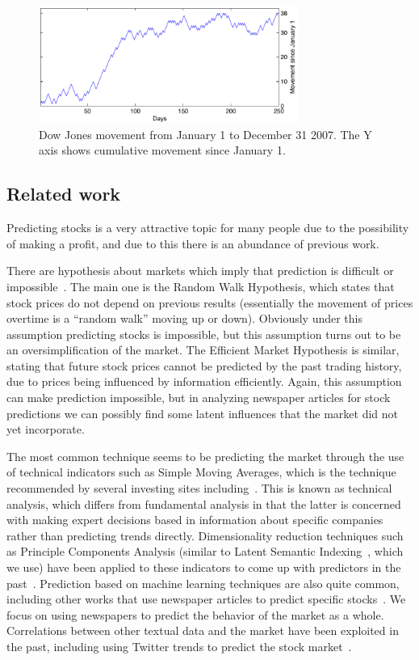 \documentclass[10pt, twocolumn]{article}
\begin{document}
\begin{figure}
\includegraphics[width=8.5cm]{experiments/dj_performance.pdf}
\caption{Dow Jones movement from January 1 to December 31 2007. The Y axis shows cumulative movement since January 1.}
\label{fig:dj-preformance}
\end{figure}

\subsection{Related work}

Predicting stocks is a very attractive topic for many people due to the possibility of making a profit, and due to this there is an abundance of previous work.

There are hypothesis about markets which imply that prediction is difficult or impossible~\cite{mlstockmarket}. The main one is the Random Walk Hypothesis, which states that stock prices do not depend on previous results (essentially the movement of prices overtime is a ``random walk'' moving up or down). Obviously under this assumption predicting stocks is impossible, but this assumption turns out to be an oversimplification of the market. The Efficient Market Hypothesis is similar, stating that future stock prices cannot be predicted by the past trading history, due to prices being influenced by information efficiently. Again, this assumption can make prediction impossible, but in analyzing newspaper articles for stock predictions we can possibly find some latent influences that the market did not yet incorporate.

The most common technique seems to be predicting the market through the use of technical indicators such as Simple Moving Averages, which is the technique recommended by several investing sites including~\cite{techindicator}. This is known as technical analysis, which differs from fundamental analysis in that the latter is concerned with making expert decisions based in information about specific companies~\cite{mlstockmarket} rather than predicting trends directly. Dimensionality reduction techniques such as Principle Components Analysis (similar to Latent Semantic Indexing~\cite{lsi}, which we use) have been applied to these indicators to come up with predictors in the past~\cite{techdim}. Prediction based on machine learning techniques are also quite common, including other works that use newspaper articles to predict specific stocks~\cite{mlstockmarket}. We focus on using newspapers to predict the behavior of the market as a whole. Correlations between other textual data and the market have been exploited in the past, including using Twitter trends to predict the stock market~\cite{twitter}.
\end{document}

